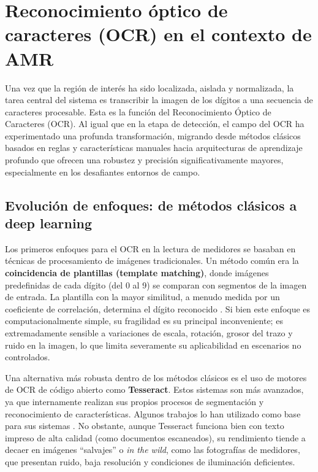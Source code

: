 \section{Reconocimiento óptico de caracteres (OCR) en el contexto de AMR}
\label{sec:ocr_for_amr}

Una vez que la región de interés ha sido localizada, aislada y normalizada, la tarea central del sistema es transcribir la imagen de los dígitos a una secuencia de caracteres procesable. Esta es la función del Reconocimiento Óptico de Caracteres (OCR). Al igual que en la etapa de detección, el campo del OCR ha experimentado una profunda transformación, migrando desde métodos clásicos basados en reglas y características manuales hacia arquitecturas de aprendizaje profundo que ofrecen una robustez y precisión significativamente mayores, especialmente en los desafiantes entornos de campo.

\subsection{Evolución de enfoques: de métodos clásicos a deep learning}
\label{ssec:ocr_evolution}

Los primeros enfoques para el OCR en la lectura de medidores se basaban en técnicas de procesamiento de imágenes tradicionales. Un método común era la \textbf{coincidencia de plantillas (template matching)}, donde imágenes predefinidas de cada dígito (del 0 al 9) se comparan con segmentos de la imagen de entrada. La plantilla con la mayor similitud, a menudo medida por un coeficiente de correlación, determina el dígito reconocido \parencite{Chaki2019Automation}. Si bien este enfoque es computacionalmente simple, su fragilidad es su principal inconveniente; es extremadamente sensible a variaciones de escala, rotación, grosor del trazo y ruido en la imagen, lo que limita severamente su aplicabilidad en escenarios no controlados.

Una alternativa más robusta dentro de los métodos clásicos es el uso de motores de OCR de código abierto como \textbf{Tesseract}. Estos sistemas son más avanzados, ya que internamente realizan sus propios procesos de segmentación y reconocimiento de características. Algunos trabajos lo han utilizado como base para sus sistemas \parencite{Maheshwari2023Automatic}. No obstante, aunque Tesseract funciona bien con texto impreso de alta calidad (como documentos escaneados), su rendimiento tiende a decaer en imágenes ``salvajes'' o \textit{in the wild}, como las fotografías de medidores, que presentan ruido, baja resolución y condiciones de iluminación deficientes.

